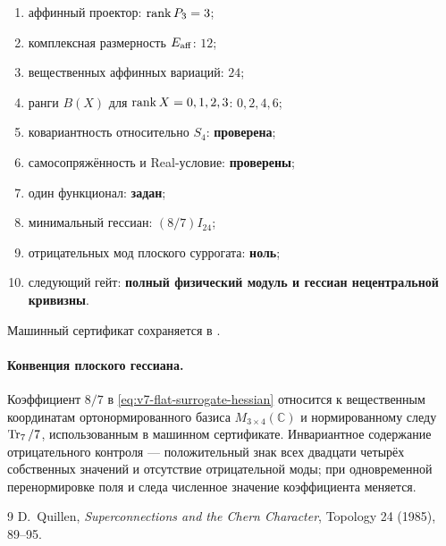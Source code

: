 \begin{protocol}
\begin{enumerate}
 \item аффинный проектор: \textbf{$\operatorname{rank} P_3=3$};
 \item комплексная размерность $E_{\rm aff}$: \textbf{$12$};
 \item вещественных аффинных вариаций: \textbf{$24$};
 \item ранги $B(X)$ для $\operatorname{rank} X=0,1,2,3$: \textbf{$0,2,4,6$};
 \item ковариантность относительно $S_4$: \textbf{проверена};
 \item самосопряжённость и Real-условие: \textbf{проверены};
 \item один функционал: \textbf{задан};
 \item минимальный гессиан: \textbf{$(8/7)I_{24}$};
 \item отрицательных мод плоского суррогата: \textbf{ноль};
 \item следующий гейт: \textbf{полный физический модуль и гессиан
 нецентральной кривизны}.
\end{enumerate}
\end{protocol}

Машинный сертификат сохраняется в
.

\paragraph{Конвенция плоского гессиана.}
Коэффициент $8/7$ в \eqref{eq:v7-flat-surrogate-hessian} относится к
вещественным координатам ортонормированного базиса
$M_{3\times4}(\mathbb C)$ и нормированному следу $\operatorname{Tr}_7/7$, использованным в
машинном сертификате. Инвариантное содержание отрицательного контроля ---
положительный знак всех двадцати четырёх собственных значений и отсутствие
отрицательной моды; при одновременной перенормировке поля и следа численное
значение коэффициента меняется.

\begin{thebibliography}{9}
D.~Quillen,
\emph{Superconnections and the Chern Character},
Topology 24 (1985), 89--95.
\end{thebibliography}